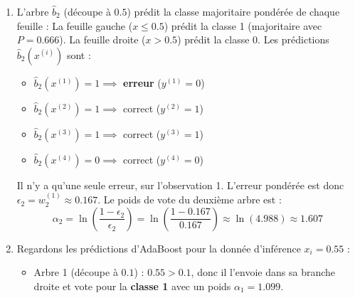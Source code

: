 \documentclass[solutions]{../exercices}
\begin{document}
\begin{solution}
\begin{enumerate}
\begin{itemize}
        \item \textbf{Découpe à $x^* = 0.5$ :} 
        La branche droite (obs 4) est pure $\implies$ entropie 0. 
        Pour la branche gauche (obs 1, 2, 3), la somme des poids est $0.167 \times 3 \approx 0.5$. 
        Les probabilités pondérées sont $P(Y=1) = \frac{0.167+0.167}{0.5} \approx 0.666$ et $P(Y=0) = \frac{0.167}{0.5} \approx 0.334$. 
        L'entropie de la branche de gauche est $-0.666 \ln(0.666) - 0.334 \ln(0.334) \approx 0.636$.
        L'entropie pondérée de la découpe vaut : $\frac{0.5}{1} \times 0.636 + \frac{0.5}{1} \times 0 = 0.318$.
    \end{itemize}
    L'entropie pondérée pour la découpe en $x^* = 0.5$ est plus faible ($0.318 < 0.561$). L'arbre va donc choisir la découpe \textbf{$x^* = 0.5$}.
    C'est un choix très logique : comme l'observation 4 a pris un poids plus important (0.5 sur un total de 1), l'algorithme privilégie une découpe qui la classifie correctement et l'isole.
    \item L'arbre $\hat{b}_2$ (découpe à $0.5$) prédit la classe majoritaire pondérée de chaque feuille :
    La feuille gauche ($x \leq 0.5$) prédit la classe 1 (majoritaire avec $P=0.666$).
    La feuille droite ($x > 0.5$) prédit la classe 0.
    Les prédictions $\hat{b}_2(x^{(i)})$ sont :
    \begin{itemize}
        \item $\hat{b}_2(x^{(1)}) = 1 \implies$ \textbf{erreur} ($y^{(1)}=0$)
        \item $\hat{b}_2(x^{(2)}) = 1 \implies$ correct ($y^{(2)}=1$)
        \item $\hat{b}_2(x^{(3)}) = 1 \implies$ correct ($y^{(3)}=1$)
        \item $\hat{b}_2(x^{(4)}) = 0 \implies$ correct ($y^{(4)}=0$)
    \end{itemize}
    Il n'y a qu'une seule erreur, sur l'observation 1. L'erreur pondérée est donc $\epsilon_2 = w_2^{(1)} \approx 0.167$.
    Le poids de vote du deuxième arbre est :
    \begin{equation*}
        \alpha_2 = \ln\left(\frac{1-\epsilon_2}{\epsilon_2}\right) = \ln\left(\frac{1-0.167}{0.167}\right) \approx \ln(4.988) \approx 1.607
    \end{equation*}
    \item Regardons les prédictions d'AdaBoost pour la donnée d'inférence $x_i = 0.55$ :
    \begin{itemize}
        \item Arbre 1 (découpe à $0.1$) : $0.55 > 0.1$, donc il l'envoie dans sa branche droite et vote pour la \textbf{classe 1} avec un poids $\alpha_1 = 1.099$.

\end{itemize}
\end{enumerate}
\end{solution}
\end{document}
